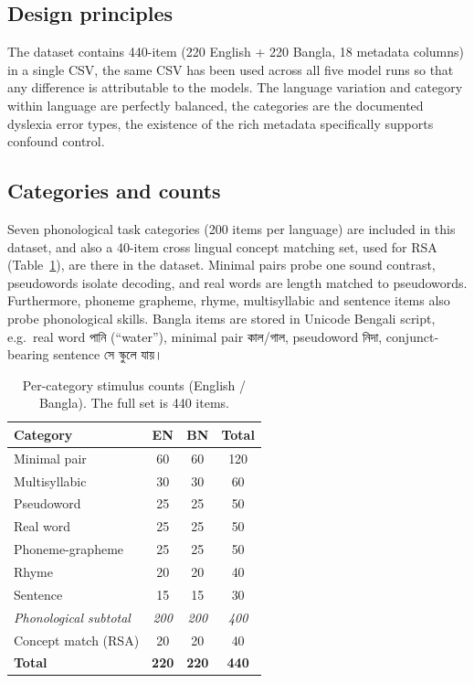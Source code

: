 \documentclass[preprint,12pt]{elsarticle}
\newcommand{\bn}[1]{{\banglafont #1}}
\begin{document}
\subsection{Design principles}
The dataset contains 440-item (220 English + 220 Bangla, 18 metadata columns) in a single CSV, the same CSV has been used across all five model runs so that any difference is attributable to the models. The language variation and category within language are perfectly balanced, the categories are the documented dyslexia error types, the existence of the rich metadata specifically supports confound control.

\subsection{Categories and counts}
Seven phonological task categories (200 items per language) are included in this dataset, and also a 40-item cross lingual concept matching set, used for RSA (Table~\ref{tab:data}), are there in the dataset. Minimal pairs probe one sound contrast, pseudowords isolate decoding, and real words are length matched to pseudowords. Furthermore, phoneme grapheme, rhyme, multisyllabic and sentence items also probe phonological skills. Bangla items are stored in Unicode Bengali script, e.g.\ real word \bn{পানি} (``water''), minimal pair \bn{কাল}/\bn{গাল}, pseudoword \bn{নিদা}, conjunct-bearing sentence \bn{সে স্কুলে যায়।}

\begin{table}[H]
\caption{Per-category stimulus counts (English / Bangla). The full set is 440 items.}
\label{tab:data}
\centering
\small
\begin{tabular}{lccc}
\toprule
\textbf{Category} & \textbf{EN} & \textbf{BN} & \textbf{Total} \\
\midrule
Minimal pair        & 60 & 60 & 120 \\
Multisyllabic       & 30 & 30 & 60 \\
Pseudoword          & 25 & 25 & 50 \\
Real word           & 25 & 25 & 50 \\
Phoneme-grapheme    & 25 & 25 & 50 \\
Rhyme               & 20 & 20 & 40 \\
Sentence            & 15 & 15 & 30 \\
\textit{Phonological subtotal} & \textit{200} & \textit{200} & \textit{400} \\
Concept match (RSA) & 20 & 20 & 40 \\
\midrule
\textbf{Total}      & \textbf{220} & \textbf{220} & \textbf{440} \\
\bottomrule
\end{tabular}
\end{table}
\end{document}
